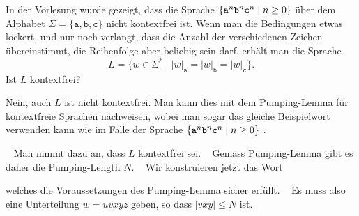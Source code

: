 In der Vorlesung wurde gezeigt, dass die Sprache
$\{\texttt{a}\mathstrut^n\texttt{b}\mathstrut^n\texttt{c}\mathstrut^n\mid n\ge 0\}$
über dem Alphabet $\Sigma=\{\texttt{a},\texttt{b},\texttt{c}\}$
nicht kontextfrei ist.
Wenn man die Bedingungen etwas lockert, und nur noch verlangt, dass die
Anzahl der verschiedenen Zeichen übereinstimmt, die Reihenfolge aber
beliebig sein darf, erhält man die Sprache
\[
L=\{w\in\Sigma^*\mid |w|_\texttt{a}=|w|_\texttt{b}=|w|_\texttt{c}\}.
\]
Ist $L$ kontextfrei?


\begin{loesung}
Nein, auch $L$ ist nicht kontextfrei.
Man kann dies mit dem Pumping-Lemma für kontextfreie Sprachen nachweisen,
wobei man sogar das gleiche Beispielwort verwenden kann wie im Falle der
Sprache $\{ \texttt{a}\mathstrut^n \texttt{b}\mathstrut^n \texttt{c}\mathstrut^n\mid  n \ge 0\}$ .

~%
Man nimmt dazu an, dass $L$ kontextfrei sei.
~%
Gemäss Pumping-Lemma gibt es daher die Pumping-Length $N$.
~%
Wir konstruieren jetzt das Wort
\begin{center}
\end{center}
welches die Voraussetzungen
des Pumping-Lemma sicher erfüllt.
~%
Es muss also eine Unterteilung $w=uvxyz$ geben, so dass $|vxy|\le N$ ist.
\begin{center}
\end{center}
\end{loesung}
